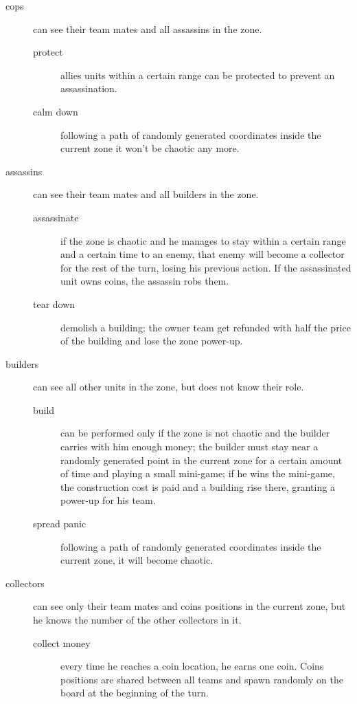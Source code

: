 			\begin{description}
				\item[cops] can see their team mates and all assassins in the zone.
					\begin{description}
						\item[protect] allies units within a certain range can be protected to prevent an assassination.
						\item[calm down] following a path of randomly generated coordinates inside the current zone it won't be chaotic any more.
					\end{description}
				\item[assassins] can see their team mates and all builders in the zone.
					\begin{description}
						\item[assassinate] if the zone is chaotic and he manages to stay within a certain range and a certain time to an enemy, that enemy will become a collector for the rest of the turn, losing his previous action. If the assassinated unit owns coins, the assassin robs them.
						\item[tear down] demolish a building; the owner team get refunded with half the price of the building and lose the zone power-up.
					\end{description}
				\item[builders] can see all other units in the zone, but does not know their role.
					\begin{description}
						\item[build] can be performed only if the zone is not chaotic and the builder carries with him enough money; the builder must stay near a randomly generated point in the current zone for a certain amount of time and playing a small mini-game; if he wins the mini-game, the construction cost is paid and a building rise there, granting a power-up for his team.
						\item[spread panic] following a path of randomly generated coordinates inside the current zone, it will become chaotic.
					\end{description}
				\item[collectors] can see only their team mates and coins positions in the current zone, but he knows the number of the other collectors in it.
					\begin{description}
						\item[collect money] every time he reaches a coin location, he earns one coin. Coins positions are shared between all teams and spawn randomly on the board at the beginning of the turn.
					\end{description}
			\end{description}
			
